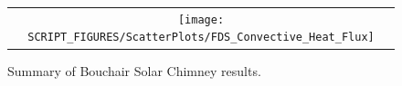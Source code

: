 \begin{figure}[h!]
\begin{center}
\begin{tabular}{c}
\texttt{[image: SCRIPT\_FIGURES/ScatterPlots/FDS\_Convective\_Heat\_Flux]}
\end{tabular}
\end{center}
\caption{Summary of Bouchair Solar Chimney results.}
\label{Mass Flow Rate}
\end{figure}


